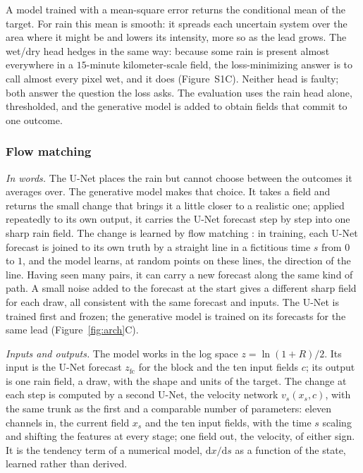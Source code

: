\documentclass[draft]{agujournal2019}
\begin{document}
A model trained with a mean-square error returns the conditional mean of
the target. For rain this mean is smooth: it spreads each uncertain
system over the area where it might be and lowers its intensity, more so
as the lead grows. The wet/dry head hedges in the same way: because some
rain is present almost everywhere in a $15$-minute kilometer-scale field,
the loss-minimizing answer is to call almost every pixel wet, and it does
(Figure~S1C). Neither head is faulty; both answer the question the loss
asks. The evaluation uses the rain head alone, thresholded, and the
generative model is added to obtain fields that commit to one outcome.

\subsubsection{Flow matching}

\textit{In words.} The U-Net places the rain but cannot choose between
the outcomes it averages over. The generative model makes that choice. It
takes a field and returns the small change that brings it a little closer
to a realistic one; applied repeatedly to its own output, it carries the U-Net forecast
step by step into one sharp rain field. The change is learned by flow
matching \cite{lipman2023, liu2023}: in training, each U-Net forecast is
joined to its own truth by a straight line in a fictitious time $s$ from
$0$ to $1$, and the model learns, at random points on these lines, the
direction of the line. Having seen many pairs, it can carry a new
forecast along the same kind of path. A small noise added to the
forecast at the start gives a different sharp field for each draw, all
consistent with the same forecast and inputs. The U-Net is trained first
and frozen; the generative model is trained on its forecasts for the same
lead (Figure~\ref{fig:arch}C).

\textit{Inputs and outputs.} The model works in the log space
$z = \ln(1 + R)/2$. Its input is the U-Net forecast $z_{\mathrm{fc}}$ for
the block and the ten input fields $c$; its output is one rain field, a
draw, with the shape and units of the target. The change at each step is
computed by a second U-Net, the velocity network $v_s(x_s, c)$,
with the same trunk as the first and a comparable number of parameters:
eleven channels in, the current field $x_s$ and the ten input fields, with
the time $s$ scaling and shifting the features at every stage; one field
out, the velocity, of either sign. It is the tendency term of a numerical
model, $\mathrm{d}x/\mathrm{d}s$ as a function of the state, learned
rather than derived.
\end{document}
